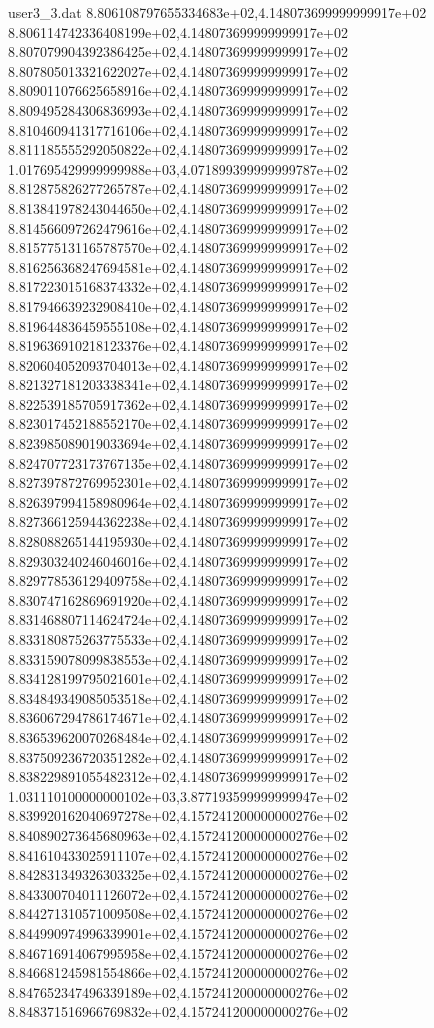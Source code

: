 \begin{filecontents}{user3_3.dat}
8.806108797655334683e+02,4.148073699999999917e+02
8.806114742336408199e+02,4.148073699999999917e+02
8.807079904392386425e+02,4.148073699999999917e+02
8.807805013321622027e+02,4.148073699999999917e+02
8.809011076625658916e+02,4.148073699999999917e+02
8.809495284306836993e+02,4.148073699999999917e+02
8.810460941317716106e+02,4.148073699999999917e+02
8.811185555292050822e+02,4.148073699999999917e+02
1.017695429999999988e+03,4.071899399999999787e+02
8.812875826277265787e+02,4.148073699999999917e+02
8.813841978243044650e+02,4.148073699999999917e+02
8.814566097262479616e+02,4.148073699999999917e+02
8.815775131165787570e+02,4.148073699999999917e+02
8.816256368247694581e+02,4.148073699999999917e+02
8.817223015168374332e+02,4.148073699999999917e+02
8.817946639232908410e+02,4.148073699999999917e+02
8.819644836459555108e+02,4.148073699999999917e+02
8.819636910218123376e+02,4.148073699999999917e+02
8.820604052093704013e+02,4.148073699999999917e+02
8.821327181203338341e+02,4.148073699999999917e+02
8.822539185705917362e+02,4.148073699999999917e+02
8.823017452188552170e+02,4.148073699999999917e+02
8.823985089019033694e+02,4.148073699999999917e+02
8.824707723173767135e+02,4.148073699999999917e+02
8.827397872769952301e+02,4.148073699999999917e+02
8.826397994158980964e+02,4.148073699999999917e+02
8.827366125944362238e+02,4.148073699999999917e+02
8.828088265144195930e+02,4.148073699999999917e+02
8.829303240246046016e+02,4.148073699999999917e+02
8.829778536129409758e+02,4.148073699999999917e+02
8.830747162869691920e+02,4.148073699999999917e+02
8.831468807114624724e+02,4.148073699999999917e+02
8.833180875263775533e+02,4.148073699999999917e+02
8.833159078099838553e+02,4.148073699999999917e+02
8.834128199795021601e+02,4.148073699999999917e+02
8.834849349085053518e+02,4.148073699999999917e+02
8.836067294786174671e+02,4.148073699999999917e+02
8.836539620070268484e+02,4.148073699999999917e+02
8.837509236720351282e+02,4.148073699999999917e+02
8.838229891055482312e+02,4.148073699999999917e+02
1.031110100000000102e+03,3.877193599999999947e+02
8.839920162040697278e+02,4.157241200000000276e+02
8.840890273645680963e+02,4.157241200000000276e+02
8.841610433025911107e+02,4.157241200000000276e+02
8.842831349326303325e+02,4.157241200000000276e+02
8.843300704011126072e+02,4.157241200000000276e+02
8.844271310571009508e+02,4.157241200000000276e+02
8.844990974996339901e+02,4.157241200000000276e+02
8.846716914067995958e+02,4.157241200000000276e+02
8.846681245981554866e+02,4.157241200000000276e+02
8.847652347496339189e+02,4.157241200000000276e+02
8.848371516966769832e+02,4.157241200000000276e+02

\end{filecontents}
